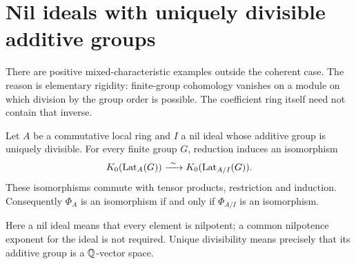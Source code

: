 \section{Nil ideals with uniquely divisible additive groups}

There are positive mixed-characteristic examples outside the coherent
case.  The reason is elementary rigidity: finite-group cohomology
vanishes on a module on which division by the group order is possible.
The coefficient ring itself need not contain that inverse.

\begin{theorem}\label{thm:rational-nil}
Let $A$ be a commutative local ring and $I$ a nil ideal whose
additive group is uniquely divisible.  For every finite group $G$,
reduction induces an isomorphism
\[
 K_0(\operatorname{Lat}_A(G))\xrightarrow{\ \sim\ }
 K_0(\operatorname{Lat}_{A/I}(G)).
\]
These isomorphisms commute with tensor products, restriction and
induction.  Consequently $\Phi_A$ is an isomorphism if and only
if $\Phi_{A/I}$ is an isomorphism.
\end{theorem}

Here a nil ideal means that every element is nilpotent; a common
nilpotence exponent for the ideal is not required.  Unique divisibility
means precisely that its additive group is a $\mathbb Q$-vector space.

